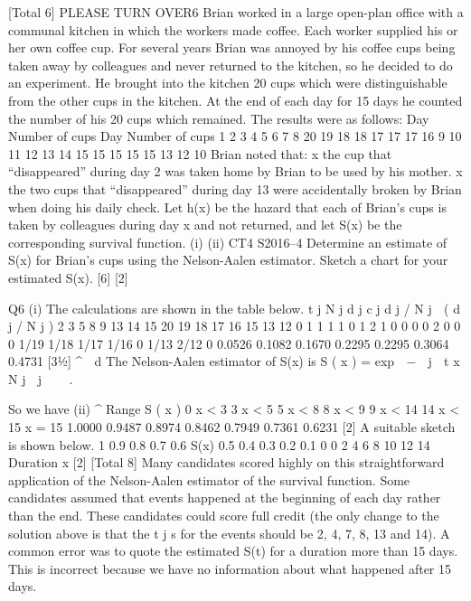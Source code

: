 [Total 6]
PLEASE TURN OVER6
Brian worked in a large open-plan office with a communal kitchen in which the
workers made coffee. Each worker supplied his or her own coffee cup. For several
years Brian was annoyed by his coffee cups being taken away by colleagues and
never returned to the kitchen, so he decided to do an experiment. He brought into the
kitchen 20 cups which were distinguishable from the other cups in the kitchen. At the
end of each day for 15 days he counted the number of his 20 cups which remained.
The results were as follows:
Day Number of cups Day Number of cups
1
2
3
4
5
6
7
8 20
19
18
18
17
17
17
16 9
10
11
12
13
14
15 15
15
15
15
13
12
10
Brian noted that:
x the cup that “disappeared” during day 2 was taken home by Brian to be used by
his mother.
x the two cups that “disappeared” during day 13 were accidentally broken by Brian
when doing his daily check.
Let h(x) be the hazard that each of Brian’s cups is taken by colleagues during day x
and not returned, and let S(x) be the corresponding survival function.
(i)
(ii)
CT4 S2016–4
Determine an estimate of S(x) for Brian’s cups using the Nelson-Aalen
estimator.
Sketch a chart for your estimated S(x).
[6]
[2]


Q6
(i)
The calculations are shown in the table below.
t j N j d j c j d j / N j  ( d j / N j )
2
3
5
8
9
13
14
15 20
19
18
17
16
15
13
12 0
1
1
1
1
0
1
2 1
0
0
0
0
2
0
0 0
1/19
1/18
1/17
1/16
0
1/13
2/12 0
0.0526
0.1082
0.1670
0.2295
0.2295
0.3064
0.4731
[31⁄2]
^

d
The Nelson-Aalen estimator of S(x) is S ( x ) = exp  −  j
 t \leq x N j
 j

  .


So we have
(ii)
^
Range S ( x )
0 \leq x < 3
3 \leq x < 5
5 \leq x < 8
8 \leq x < 9
9 \leq x < 14
14 \leq x < 15
x = 15 1.0000
0.9487
0.8974
0.8462
0.7949
0.7361
0.6231
[2]
A suitable sketch is shown below.
1
0.9
0.8
0.7
0.6
S(x) 0.5
0.4
0.3
0.2
0.1
0
0
2
4
6
8
10
12
14
Duration x
[2]
[Total 8]
Many candidates scored highly on this straightforward application of the
Nelson-Aalen estimator of the survival function. Some candidates assumed
that events happened at the beginning of each day rather than the end.
These candidates could score full credit (the only change to the solution
above is that the t j s for the events should be 2, 4, 7, 8, 13 and 14). A
common error was to quote the estimated S(t) for a duration more than 15
days. This is incorrect because we have no information about what happened
after 15 days.

